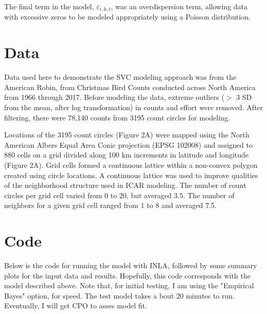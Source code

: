 \documentclass[]{article}
\begin{document}
The final term in the model, $\varepsilon_{i,k,t}$, was an overdispersion term, allowing data with excessive zeros to be modeled appropriately using a Poisson distribution.


\section{Data}
Data used here to demonstrate the SVC modeling approach was from the American Robin, from Christmas Bird Counts conducted across North America from 1966 through 2017. Before modeling the data, extreme outliers ($>$ 3 SD from the mean, after log transformation) in counts and effort were removed. After filtering, there were 78,140 counts from 3195 count circles for modeling.

Locations of the 3195 count circles (Figure 2A) were mapped using the North American Albers Equal Area Conic projection (EPSG 102008) and assigned to 880 cells on a grid divided along 100 km increments in latitude and longitude (Figure 2A). Grid cells formed a continuous lattice within a non-convex polygon created using circle locations. A continuous lattice was used to improve qualities of the neighborhood structure used in ICAR modeling. The number of count circles per grid cell varied from 0 to 20, but averaged 3.5. The number of neighbors for a given grid cell ranged from 1 to 8 and averaged 7.5.



\section{Code}
Below is the code for running the model with INLA, followed by some summary plots for the input data and results. Hopefully, this code corresponds with the model described above. Note that, for initial testing, I am using the "Empirical Bayes" option, for speed. The test model takes a bout 20 minutes to run. Eventually, I will get CPO to asses model fit. 
\end{document}
